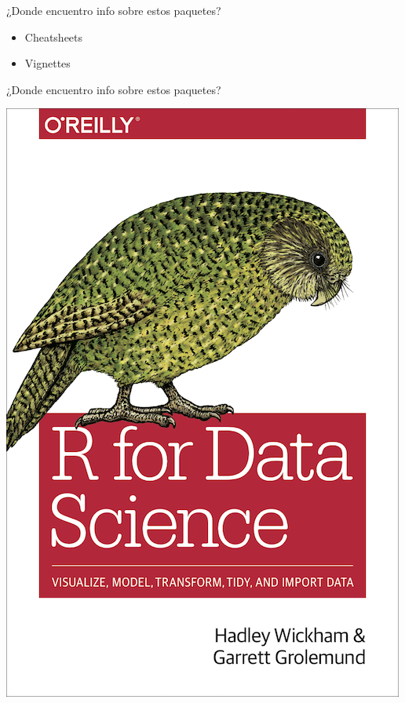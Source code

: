 \documentclass[ignorenonframetext,]{beamer}
\newenvironment{Shaded}{\begin{snugshade}}{\end{snugshade}}
\newcommand{\CommentTok}[1]{\textcolor[rgb]{0.56,0.35,0.01}{\textit{#1}}}
\newcommand{\KeywordTok}[1]{\textcolor[rgb]{0.13,0.29,0.53}{\textbf{#1}}}
\newcommand{\NormalTok}[1]{#1}
\newcommand{\OperatorTok}[1]{\textcolor[rgb]{0.81,0.36,0.00}{\textbf{#1}}}
\newcommand{\StringTok}[1]{\textcolor[rgb]{0.31,0.60,0.02}{#1}}
\providecommand{\tightlist}{%
  \setlength{\itemsep}{0pt}\setlength{\parskip}{0pt}}
\begin{document}
\begin{frame}[fragile]{}
\protect\hypertarget{section-15}{}


\begin{Shaded}
\end{Shaded}

\end{frame}

\begin{frame}{¿Donde encuentro info sobre estos paquetes?}
\protect\hypertarget{donde-encuentro-info-sobre-estos-paquetes}{}

\begin{itemize}
\tightlist
\item
  Cheatsheets
\item
  Vignettes
\end{itemize}

\end{frame}

\begin{frame}{¿Donde encuentro info sobre estos paquetes?}
\protect\hypertarget{donde-encuentro-info-sobre-estos-paquetes-1}{}

\begin{center}\includegraphics[width=0.45\linewidth]{cover_rfordatascience} \end{center}

\end{frame}
\end{document}
